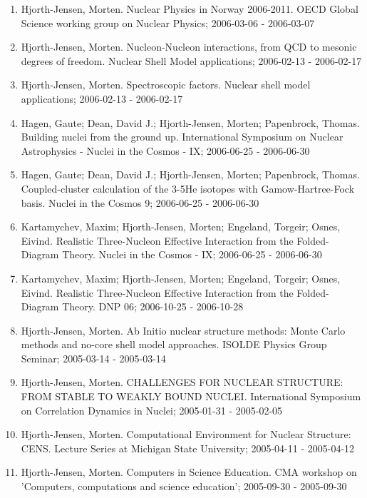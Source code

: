\documentclass[%
oneside,                 %
final,                   %
10pt]{article}
\begin{document}
\begin{enumerate}
\item Hjorth-Jensen, Morten.  Nuclear Physics in Norway 2006-2011. OECD Global Science working group on Nuclear Physics; 2006-03-06 - 2006-03-07

\item Hjorth-Jensen, Morten.  Nucleon-Nucleon interactions, from QCD to mesonic degrees of freedom. Nuclear Shell Model applications; 2006-02-13 - 2006-02-17

\item Hjorth-Jensen, Morten.  Spectroscopic factors. Nuclear shell model applications; 2006-02-13 - 2006-02-17

\item Hagen, Gaute; Dean, David J.; Hjorth-Jensen, Morten; Papenbrock, Thomas.  Building nuclei from the ground up. International Symposium on Nuclear Astrophysics - Nuclei in the Cosmos - IX; 2006-06-25 - 2006-06-30

\item Hagen, Gaute; Dean, David J.; Hjorth-Jensen, Morten; Papenbrock, Thomas.  Coupled-cluster calculation of the 3-5He isotopes with Gamow-Hartree-Fock basis. Nuclei in the Cosmos 9; 2006-06-25 - 2006-06-30

\item Kartamychev, Maxim; Hjorth-Jensen, Morten; Engeland, Torgeir; Osnes, Eivind.  Realistic Three-Nucleon Effective Interaction from the Folded-Diagram Theory. Nuclei in the Cosmos - IX; 2006-06-25 - 2006-06-30

\item Kartamychev, Maxim; Hjorth-Jensen, Morten; Engeland, Torgeir; Osnes, Eivind. Realistic Three-Nucleon Effective Interaction from the Folded-Diagram Theory. DNP 06; 2006-10-25 - 2006-10-28

\item Hjorth-Jensen, Morten.  Ab Initio nuclear structure methods: Monte Carlo methods and no-core shell model approaches. ISOLDE Physics Group Seminar; 2005-03-14 - 2005-03-14

\item Hjorth-Jensen, Morten. CHALLENGES FOR NUCLEAR STRUCTURE: FROM STABLE TO WEAKLY BOUND NUCLEI. International Symposium on Correlation Dynamics in Nuclei; 2005-01-31 - 2005-02-05

\item Hjorth-Jensen, Morten.  Computational Environment for Nuclear Structure: CENS. Lecture Series at Michigan State University; 2005-04-11 - 2005-04-12

\item Hjorth-Jensen, Morten.  Computers in Science Education. CMA workshop on 'Computers, computations and science education'; 2005-09-30 - 2005-09-30


\end{enumerate}
\end{document}
